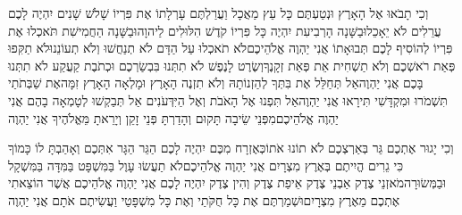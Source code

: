 \documentclass[../main/main.tex]{subfiles}
\begin{document}
\begin{multicols*}{\ncols}
וְכִי תָבֹאוּ אֶל הָאָרֶץ וּנְטַעְתֶּם כָּל עֵץ מַאֲכָל וַעֲרַלְתֶּם עָרְלָתוֹ אֶת פִּרְיוֹ שָׁלֹשׁ שָׁנִים יִהְיֶה לָכֶם עֲרֵלִים לֹא יֵאָכֵל\PreVerseSpace{}וּבַשָּׁנָה הָרְבִיעִת יִהְיֶה כָּל פִּרְיוֹ קֹדֶשׁ הִלּוּלִים לַיהוָה\PreVerseSpace{}וּבַשָּׁנָה הַחֲמִישִׁת תֹּאכְלוּ אֶת פִּרְיוֹ לְהוֹסִיף לָכֶם תְּבוּאָתוֹ אֲנִי יַהְוֶה אֱלֹהֵיכֶם\PreVerseSpace{}לֹא תֹאכְלוּ עַל הַדָּם לֹא תְנַחֲשׁוּ וְלֹא תְעוֹנֵנוּ\PreVerseSpace{}לֹא תַקִּפוּ פְּאַת רֹאשְׁכֶם וְלֹא תַשְׁחִית אֵת פְּאַת זְקָנֶךָ\PreVerseSpace{}וְשֶׂרֶט לָנֶפֶשׁ לֹא תִתְּנוּ בִּבְשַׂרְכֶם וּכְתֹבֶת קַעֲקַע לֹא תִתְּנוּ בָּכֶם אֲנִי יַהְוֶה\PreVerseSpace{}אַל תְּחַלֵּל אֶת בִּתְּךָ לְהַזְנוֹתָהּ וְלֹא תִזְנֶה הָאָרֶץ וּמָלְאָה הָאָרֶץ זִמָּה\PreVerseSpace{}אֶת שַׁבְּתֹתַי תִּשְׁמֹרוּ וּמִקְדָּשִׁי תִּירָאוּ אֲנִי יַהְוֶה\PreVerseSpace{}אַל תִּפְנוּ אֶל הָאֹבֹת וְאֶל הַיִּדְּעֹנִים אַל תְּבַקְשׁוּ לְטָמְאָה בָהֶם אֲנִי יַהְוֶה אֱלֹהֵיכֶם\PreVerseSpace{}מִפְּנֵי שֵׂיבָה תָּקוּם וְהָדַרְתָּ פְּנֵי זָקֵן וְיָרֵאתָ מֵּאֱלֹהֶיךָ אֲנִי יַהְוֶה\OpenSection{}\par
{}וְכִי יָגוּר אֶתְכֶם\SubEnd{} גֵּר בְּאַרְצְכֶם לֹא תוֹנוּ אֹתוֹ\PreVerseSpace{}כְּאֶזְרָח מִכֶּם יִהְיֶה לָכֶם הַגֵּר הַגָּר אִתְּכֶם וְאָהַבְתָּ לוֹ כָּמוֹךָ כִּי גֵרִים הֱיִיתֶם בְּאֶרֶץ מִצְרָיִם אֲנִי יַהְוֶה אֱלֹהֵיכֶם\PreVerseSpace{}לֹא תַעֲשׂוּ עָוֶל בַּמִּשְׁפָּט בַּמִּדָּה בַּמִּשְׁקָל וּבַמְּשׂוּרָה\PreVerseSpace{}מֹאזְנֵי צֶדֶק אַבְנֵי צֶדֶק אֵיפַת צֶדֶק וְהִין צֶדֶק יִהְיֶה לָכֶם אֲנִי יַהְוֶה אֱלֹהֵיכֶם אֲשֶׁר הוֹצֵאתִי אֶתְכֶם מֵאֶרֶץ מִצְרָיִם\PreVerseSpace{}וּשְׁמַרְתֶּם אֶת כָּל חֻקֹּתַי וְאֶת כָּל מִשְׁפָּטַי וַעֲשִׂיתֶם אֹתָם אֲנִי יַהְוֶה\OpenSection{}\par

\end{multicols*}
\end{document}
